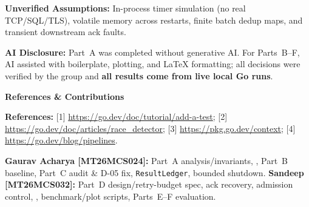 \documentclass[11pt]{article}
\newcommand{\subhead}[1]{\vspace{0.6em}\noindent\textbf{\large #1}\par\vspace{0.25em}}
\begin{document}
\textbf{Unverified Assumptions:} In-process timer simulation (no real TCP/SQL/TLS), volatile memory across restarts, finite batch dedup maps, and transient downstream ack faults.

\textbf{AI Disclosure:} Part~A was completed without generative AI. For Parts~B--F, AI assisted with boilerplate, plotting, and LaTeX formatting; all decisions were verified by the group and \textbf{all results come from live local Go runs}.

\subhead{References \& Contributions}
\textbf{References:} [1] \url{https://go.dev/doc/tutorial/add-a-test}; [2] \url{https://go.dev/doc/articles/race_detector}; [3] \url{https://pkg.go.dev/context}; [4] \url{https://go.dev/blog/pipelines}.

\textbf{Gaurav Acharya [MT26MCS024]:} Part~A analysis/invariants, , Part~B baseline, Part~C audit \& D-05 fix, \texttt{ResultLedger}, bounded shutdown. \textbf{Sandeep [MT26MCS032]:} Part~D design/retry-budget spec, ack recovery, admission control, , benchmark/plot scripts, Parts~E--F evaluation.
\end{document}
